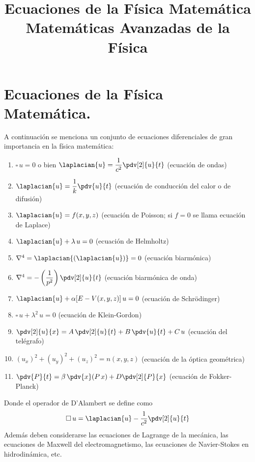 
\author{}
\usepackage{tikz-3dplot}
\title{Ecuaciones de la Física Matemática \\ {\large Matemáticas Avanzadas de la Física}\vspace{-1.5\baselineskip}}
\date{}
\author{}

\maketitle
\fontsize{14}{14}\selectfont
\section{Ecuaciones de la Física Matemática.}
A continuación se menciona un conjunto de ecuaciones diferenciales de gran importancia en la física matemática:
\begin{enumerate}[label=\alph*)]
\item $\square \, u = 0$ o bien $\laplacian{u} = \dfrac{1}{c^{2}} \displaystyle \pdv[2]{u}{t}$ (ecuación de ondas)
\item $\laplacian{u} = \dfrac{1}{k} \displaystyle \pdv{u}{t}$ (ecuación de conducción del calor o de difusión)
\item $\laplacian{u} = f(x, y, z)$ (ecuación de Poisson; si $f=0$ se llama ecuación de Laplace)
\item $\laplacian{u} + \lambda \, u = 0$ (ecuación de Helmholtz)
\item $\nabla^{4} = \laplacian{(\laplacian{u})} = 0$ (ecuación biarmónica)
\item $\nabla^{4} = - \left( \dfrac{1}{p^{2}} \right) \displaystyle \pdv[2]{u}{t}$ (ecuación biarmónica de onda)
\item $\laplacian{u} + \alpha [E - V(x, y, z)] \, u = 0$ (ecuación de Schrödinger)
\item $\square \, u + \lambda^{2} \, u = 0$ (ecuación de Klein-Gordon)
\item $\displaystyle \pdv[2]{u}{x} = A \, \displaystyle \pdv[2]{u}{t} + B \, \displaystyle \pdv{u}{t} + C \, u$ (ecuación del telégrafo)
\item $(u_{x})^{2} + (u_{y})^{2} + (u_{z})^{2} =  n (x, y, z)$ (ecuación de la óptica geométrica)
\item $\displaystyle \pdv{P}{t} = \beta \, \displaystyle \pdv{x} (P \, x) +  D \displaystyle \pdv[2]{P}{x}$ (ecuación de Fokker-Planck)
\end{enumerate}
Donde el operador de D'Alambert se define como
\begin{align*}
\square \, u = \laplacian{u} - \dfrac{1}{c^{2}} \displaystyle \pdv[2]{u}{t}
\end{align*}
Además deben considerarse las ecuaciones de Lagrange de la mecánica, las ecuaciones de Maxwell del electromagnetismo, las ecuaciones de Navier-Stokes en hidrodinámica, etc.
